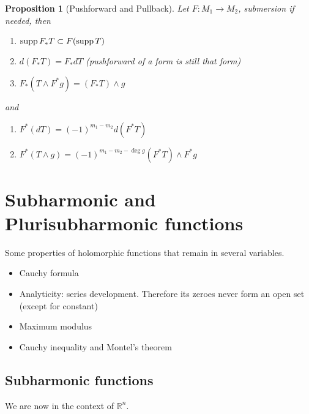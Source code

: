 \documentclass[11pt]{article}
\newtheorem{proposition}{Proposition}[theorem]
\newcommand{\supp}{\mathop{\rm supp}\nolimits}
\begin{document}
\begin{proposition}[Pushforward and Pullback]
Let \(F: M_1 \longrightarrow M_2\), submersion if needed, then
\begin{enumerate}
\item \(\supp F_* T \subset F(\supp T)\)
\item \(d(F_* T) = F_* dT\) (pushforward of a form is still that form)
\item \(F_*(T\wedge F^* g) = (F_*T)\wedge g\)
\end{enumerate}
and
\begin{enumerate}
\item \(F^*(dT) = (-1)^{m_1-m_2} d(F^* T)\)
\item \(F^*(T\wedge g) = (-1)^{m_1-m_2 -\deg g}(F^* T)\wedge F^* g\)
\end{enumerate}
\end{proposition}



\section{Subharmonic and Plurisubharmonic functions}
\label{sec:orge29eef8}

Some properties of holomorphic functions that remain in several variables.
\begin{itemize}
\item Cauchy formula
\item Analyticity: series development. Therefore its zeroes never form an open set (except for constant)
\item Maximum modulus
\item Cauchy inequality and Montel's theorem
\end{itemize}


\subsection{Subharmonic functions}
\label{sec:org4e15d5e}
We are now in the context of \(\mathbb{R}^n\).
\end{document}
